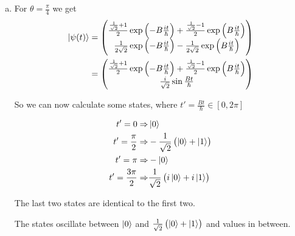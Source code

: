 \documentclass[a4paper,german,12pt,smallheadings]{scrartcl}
\newcommand\pgfmathsinandcos[3]{%
  \pgfmathsetmacro#1{sin(#3)}%
  \pgfmathsetmacro#2{cos(#3)}%
}
\newcommand\LongitudePlane[3][current plane]{%
  \pgfmathsinandcos\sinEl\cosEl{#2} %
  \pgfmathsinandcos\sint\cost{#3} %
  \tikzset{#1/.estyle={cm={\cost,\sint*\sinEl,0,\cosEl,(0,0)}}}
}
\newcommand\LatitudePlane[3][current plane]{%
  \pgfmathsinandcos\sinEl\cosEl{#2} %
  \pgfmathsinandcos\sint\cost{#3} %
  \pgfmathsetmacro\yshift{\cosEl*\sint}
  \tikzset{#1/.estyle={cm={\cost,0,0,\cost*\sinEl,(0,\yshift)}}} %
}
\newcommand\DrawLongitudeCircle[2][1]{
  \LongitudePlane{\angEl}{#2}
  \tikzset{current plane/.prefix style={scale=#1}}
  \pgfmathsetmacro\angVis{atan(sin(#2)*cos(\angEl)/sin(\angEl))} %
  \draw[current plane] (\angVis:1) arc (\angVis:\angVis+180:1);
  \draw[current plane,dashed] (\angVis-180:1) arc (\angVis-180:\angVis:1);
}
\newcommand\DrawLatitudeCircle[2][1]{
  \LatitudePlane{\angEl}{#2}
  \tikzset{current plane/.prefix style={scale=#1}}
  \pgfmathsetmacro\sinVis{sin(#2)/cos(#2)*sin(\angEl)/cos(\angEl)}
  \pgfmathsetmacro\angVis{asin(min(1,max(\sinVis,-1)))}
  \draw[current plane] (\angVis:1) arc (\angVis:-\angVis-180:1);
  \draw[current plane,dashed] (180-\angVis:1) arc (180-\angVis:\angVis:1);
}
\begin{document}
\begin{enumerate}[a)]
  \item
    For $\theta = \frac{\pi}{4}$ we get
    \begin{align*}
      \ket{\psi(t)} &= 
      \begin{pmatrix}
        \frac{\frac{1}{\sqrt{2}} + 1}{2} \exp\del{-B\frac{it}{\hbar}} + \frac{\frac{1}{\sqrt{2}} - 1}{2} \exp\del{B\frac{it}{\hbar}} \\
        \frac{1}{2\sqrt{2}} \exp\del{-B\frac{it}{\hbar}} - \frac{1}{2\sqrt{2}} \exp\del{B\frac{it}{\hbar}}
      \end{pmatrix} \\
      &= 
      \begin{pmatrix}
        \frac{\frac{1}{\sqrt{2}} + 1}{2} \exp\del{-B\frac{it}{\hbar}} + \frac{\frac{1}{\sqrt{2}} - 1}{2} \exp\del{B\frac{it}{\hbar}} \\
        \frac{i}{\sqrt{2}} \sin  \frac{Bt}{\hbar}
      \end{pmatrix}
    \end{align*}

    So we can now calculate some states, where $t' = \frac{Bt}{\hbar} \in [0, 2\pi]$

    \begin{align*}
      t' = 0 \Rightarrow             &\ket{0} \\
      t' = \frac{\pi}{2} \Rightarrow &-\frac{1}{\sqrt{2}}\del{\ket{0} + \ket{1}} \\
      t' = \pi \Rightarrow &-\ket{0} \\
      t' = \frac{3\pi}{2} \Rightarrow &\frac{1}{\sqrt{2}}\del{i\ket{0} + i\ket{1}} \\
    \end{align*}

    The last two states are identical to the first two.




The states oscillate between $\ket{0}$ and $\frac{1}{\sqrt{2}} \del{\ket{0} + \ket{1}}$ and values in between.



\end{enumerate}
\end{document}
